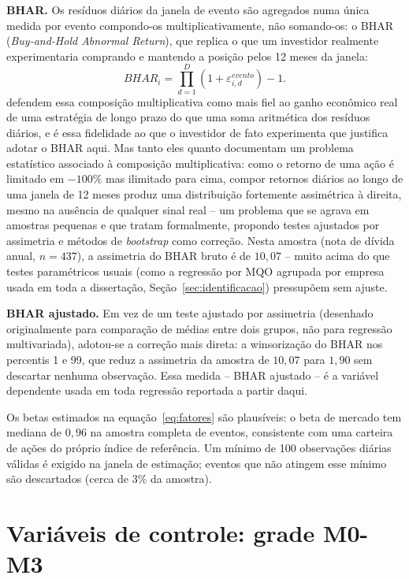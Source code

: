 \documentclass[a4paper,12pt]{report}
\begin{document}
\textbf{BHAR.} Os resíduos diários da janela de evento são agregados numa única medida por evento compondo-os multiplicativamente, não somando-os: o BHAR (\textit{Buy-and-Hold Abnormal Return}), que replica o que um investidor realmente experimentaria comprando e mantendo a posição pelos 12 meses da janela:
\begin{equation}
    \mathit{BHAR}_i = \prod_{d=1}^{D}\left(1 + \varepsilon_{i,d}^{evento}\right) - 1.
    \label{eq:bhar}
\end{equation}
 defendem essa composição multiplicativa como mais fiel ao ganho econômico real de uma estratégia de longo prazo do que uma soma aritmética dos resíduos diários, e é essa fidelidade ao que o investidor de fato experimenta que justifica adotar o BHAR aqui. Mas tanto eles quanto  documentam um problema estatístico associado à composição multiplicativa: como o retorno de uma ação é limitado em $-100\%$ mas ilimitado para cima, compor retornos diários ao longo de uma janela de 12 meses produz uma distribuição fortemente assimétrica à direita, mesmo na ausência de qualquer sinal real -- um problema que se agrava em amostras pequenas e que  tratam formalmente, propondo testes ajustados por assimetria e métodos de \textit{bootstrap} como correção. Nesta amostra (nota de dívida anual, $n=437$), a assimetria do BHAR bruto é de $10{,}07$ -- muito acima do que testes paramétricos usuais (como a regressão por MQO agrupada por empresa usada em toda a dissertação, Seção~\ref{sec:identificacao}) pressupõem sem ajuste.

\textbf{BHAR ajustado.} Em vez de um teste ajustado por assimetria (desenhado originalmente para comparação de médias entre dois grupos, não para regressão multivariada), adotou-se a correção mais direta: a winsorização do BHAR nos percentis 1 e 99, que reduz a assimetria da amostra de $10{,}07$ para $1{,}90$ sem descartar nenhuma observação. Essa medida -- BHAR ajustado -- é a variável dependente usada em toda regressão reportada a partir daqui.

Os betas estimados na equação~\ref{eq:fatores} são plausíveis: o beta de mercado tem mediana de $0{,}96$ na amostra completa de eventos, consistente com uma carteira de ações do próprio índice de referência. Um mínimo de 100 observações diárias válidas é exigido na janela de estimação; eventos que não atingem esse mínimo são descartados (cerca de 3\% da amostra).

\section{Variáveis de controle: grade M0-M3}
\label{sec:controles}
\end{document}
